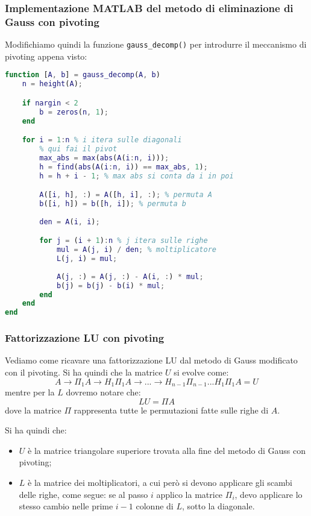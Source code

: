 \documentclass[a4paper,11pt]{article}
\begin{document}
\subsubsection{Implementazione MATLAB del metodo di eliminazione di Gauss con pivoting}
Modifichiamo quindi la funzione \lstinline|gauss_decomp()| per introdurre il meccanismo di pivoting appena visto:
\begin{lstlisting}[language=matlab, style=codestyle]	
function [A, b] = gauss_decomp(A, b)
    n = height(A);

    if nargin < 2
        b = zeros(n, 1);
    end

    for i = 1:n % i itera sulle diagonali
        % qui fai il pivot
        max_abs = max(abs(A(i:n, i)));
        h = find(abs(A(i:n, i)) == max_abs, 1);
        h = h + i - 1; % max abs si conta da i in poi

        A([i, h], :) = A([h, i], :); % permuta A
        b([i, h]) = b([h, i]); % permuta b
        
        den = A(i, i);

        for j = (i + 1):n % j itera sulle righe
            mul = A(j, i) / den; % moltiplicatore
            L(j, i) = mul;
            
            A(j, :) = A(j, :) - A(i, :) * mul;
            b(j) = b(j) - b(i) * mul;
        end
    end
end
\end{lstlisting}

\subsubsection{Fattorizzazione LU con pivoting}
Vediamo come ricavare una fattorizzazione LU dal metodo di Gauss modificato con il pivoting.
Si ha quindi che la matrice $U$ si evolve come:
$$
A \rightarrow \Pi_1 A \rightarrow H_1 \Pi_1 A \rightarrow ... \rightarrow H_{n - 1} \Pi_{n - 1} ... H_1 \Pi_1 A = U 
$$
mentre per la $L$ dovremo notare che:
$$
LU = \Pi A
$$
dove la matrice $\Pi$ rappresenta tutte le permutazioni fatte sulle righe di $A$.

Si ha quindi che:
\begin{itemize}
	\item $U$ è la matrice triangolare superiore trovata alla fine del metodo di Gauss con pivoting;
	\item $L$ è la matrice dei moltiplicatori, a cui però si devono applicare gli scambi delle righe, come segue: se al passo $i$ applico la matrice $\Pi_i$, devo applicare lo stesso cambio nelle prime $i - 1$ colonne di $L$, sotto la diagonale.
\end{itemize}
\end{document}
